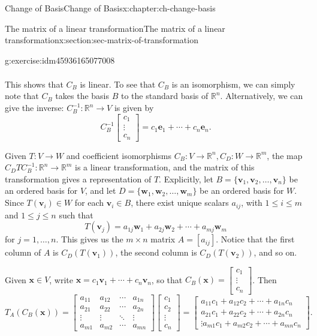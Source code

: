 \documentclass[oneside,10pt,]{book}
\numberwithin{equation}{section}
\newcommand{\bbm}{\begin{bmatrix}}
\newcommand{\ebm}{\end{bmatrix}}
\newcommand{\R}{\mathbb{R}}
\newcommand{\vv}{\mathbf{v}}
\newcommand{\ww}{\mathbf{w}}
\newcommand{\xx}{\mathbf{x}}
\newcommand{\basis}[2]{\{\mathbf{#1}_1,\mathbf{#1}_2,\ldots,\mathbf{#1}_{#2}\}}
\newcommand{\amp}{&}
\begin{document}
\begin{chapterptx}{Change of Basis}{}{Change of Basis}{}{}{x:chapter:ch-change-basis}
\begin{sectionptx}{The matrix of a linear transformation}{}{The matrix of a linear transformation}{}{}{x:section:sec-matrix-of-transformation}
\begin{inlineexercise}{}{g:exercise:idm45936165077008}
\begin{align*}
\end{align*}
%
\par
This shows that \(C_B\) is linear. To see that \(C_B\) is an isomorphism, we can simply note that \(C_B\) takes the basis \(B\) to the standard basis of \(\R^n\). Alternatively, we can give the inverse: \(C_B^{-1}:\R^n\to V\) is given by%
\begin{equation*}
C_B^{-1}\bbm c_1\\\vdots \\c_n\ebm = c_1\mathbf{e}_1+\cdots +c_n\mathbf{e}_n\text{.}
\end{equation*}
%
\end{inlineexercise}%
Given \(T:V\to W\) and coefficient isomorphisms \(C_B:V\to \R^n, C_D:W\to \R^m\), the map \(C_DTC_B^{-1}:\R^n\to \R^m\) is a linear transformation, and the matrix of this transformation gives a representation of \(T\). Explicitly, let \(B = \basis{v}{n}\) be an ordered basis for \(V\), and let \(D=\basis{w}{m}\) be an ordered basis for \(W\). Since \(T(\vv_i)\in W\) for each \(\vv_i\in B\), there exist unique scalars \(a_{ij}\), with \(1\leq i\leq m\) and \(1\leq j\leq n\) such that%
\begin{equation*}
T(\vv_j) = a_{1j}\ww_1+a_{2j}\ww_2+\cdots + a_{mj}\ww_m
\end{equation*}
for \(j=1,\ldots, n\). This gives us the \(m\times n\) matrix \(A = [a_{ij}]\). Notice that the first column of \(A\) is \(C_D(T(\vv_1))\), the second column is \(C_D(T(\vv_2))\), and so on.%
\par
Given \(\xx\in V\), write \(\xx = c_1\vv_1+\cdots + c_n\vv_n\), so that \(C_B(\xx) = \bbm c_1\\\vdots \\c_n\ebm\). Then%
\begin{equation*}
T_A(C_B(\xx)) = \bbm a_{11}\amp a_{12} \amp \cdots \amp a_{1n}\\
a_{21}\amp a_{22} \amp \cdots \amp a_{2n}\\
\vdots \amp \vdots \amp \ddots \amp \vdots\\
a_{m1}\amp a_{m2} \amp \cdots \amp a_{mn}\ebm\bbm c_1\\c_2\\ \vdots \\c_n\ebm
= \bbm a_{11}c_1+a_{12}c_2+\cdots +a_{1n}c_n\\
a_{21}c_1+a_{22}c_2+\cdots +a_{2n}c_n\\
\vdots
a_{m1}c_1+a_{m2}c_2+\cdots +a_{mn}c_n\ebm\text{.}
\end{equation*}
%
\par

\end{sectionptx}
\end{chapterptx}
\end{document}
